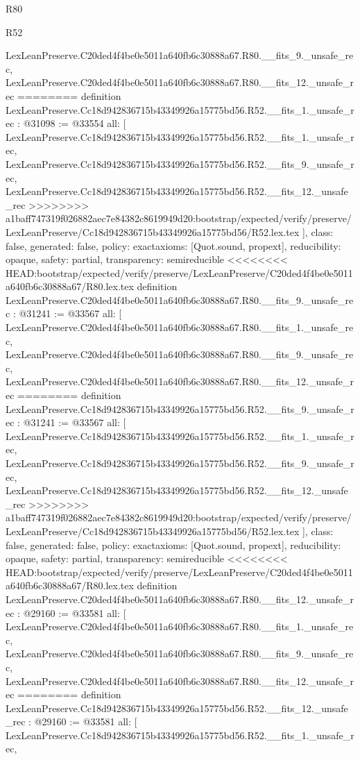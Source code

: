 \begin{lexlean}{R80}
\begin{lexlean}{R52}
\begin{coremodule}
{{{{{{{{{{{{{{{{{{{{{{{{{{{{{{{{{{{{{{{{{{{{{{{{{{{{{{{{{{{{{{{{{{{{{{{{{{{{{{{{{{{{{{{{{{{{{{{{{{{{{{{{{{{{{{{{{{{{{{{{{{{{{{{{{{{{{{{{{{{{{{{{{{{{{{{{{{{    LexLeanPreserve.C20ded4f4be0e5011a640fb6c30888a67.R80.__fits_9._unsafe_rec,
    LexLeanPreserve.C20ded4f4be0e5011a640fb6c30888a67.R80.__fits_12._unsafe_rec
========
definition LexLeanPreserve.Cc18d942836715b43349926a15775bd56.R52.__fits_1._unsafe_rec : @31098 := @33554 {
  all: [
    LexLeanPreserve.Cc18d942836715b43349926a15775bd56.R52.__fits_1._unsafe_rec,
    LexLeanPreserve.Cc18d942836715b43349926a15775bd56.R52.__fits_9._unsafe_rec,
    LexLeanPreserve.Cc18d942836715b43349926a15775bd56.R52.__fits_12._unsafe_rec
>>>>>>>> a1baff747319f026882aec7e84382c8619949d20:bootstrap/expected/verify/preserve/LexLeanPreserve/Cc18d942836715b43349926a15775bd56/R52.lex.tex
  ],
  class: false,
  generated: false,
  policy: exact{axioms: [Quot.sound, propext]},
  reducibility: opaque{},
  safety: partial,
  transparency: semireducible
}
<<<<<<<< HEAD:bootstrap/expected/verify/preserve/LexLeanPreserve/C20ded4f4be0e5011a640fb6c30888a67/R80.lex.tex
definition LexLeanPreserve.C20ded4f4be0e5011a640fb6c30888a67.R80.__fits_9._unsafe_rec : @31241 := @33567 {
  all: [
    LexLeanPreserve.C20ded4f4be0e5011a640fb6c30888a67.R80.__fits_1._unsafe_rec,
    LexLeanPreserve.C20ded4f4be0e5011a640fb6c30888a67.R80.__fits_9._unsafe_rec,
    LexLeanPreserve.C20ded4f4be0e5011a640fb6c30888a67.R80.__fits_12._unsafe_rec
========
definition LexLeanPreserve.Cc18d942836715b43349926a15775bd56.R52.__fits_9._unsafe_rec : @31241 := @33567 {
  all: [
    LexLeanPreserve.Cc18d942836715b43349926a15775bd56.R52.__fits_1._unsafe_rec,
    LexLeanPreserve.Cc18d942836715b43349926a15775bd56.R52.__fits_9._unsafe_rec,
    LexLeanPreserve.Cc18d942836715b43349926a15775bd56.R52.__fits_12._unsafe_rec
>>>>>>>> a1baff747319f026882aec7e84382c8619949d20:bootstrap/expected/verify/preserve/LexLeanPreserve/Cc18d942836715b43349926a15775bd56/R52.lex.tex
  ],
  class: false,
  generated: false,
  policy: exact{axioms: [Quot.sound, propext]},
  reducibility: opaque{},
  safety: partial,
  transparency: semireducible
}
<<<<<<<< HEAD:bootstrap/expected/verify/preserve/LexLeanPreserve/C20ded4f4be0e5011a640fb6c30888a67/R80.lex.tex
definition LexLeanPreserve.C20ded4f4be0e5011a640fb6c30888a67.R80.__fits_12._unsafe_rec : @29160 := @33581 {
  all: [
    LexLeanPreserve.C20ded4f4be0e5011a640fb6c30888a67.R80.__fits_1._unsafe_rec,
    LexLeanPreserve.C20ded4f4be0e5011a640fb6c30888a67.R80.__fits_9._unsafe_rec,
    LexLeanPreserve.C20ded4f4be0e5011a640fb6c30888a67.R80.__fits_12._unsafe_rec
========
definition LexLeanPreserve.Cc18d942836715b43349926a15775bd56.R52.__fits_12._unsafe_rec : @29160 := @33581 {
  all: [
    LexLeanPreserve.Cc18d942836715b43349926a15775bd56.R52.__fits_1._unsafe_rec,
}}}}}}}}}}}}}}}}}}}}}}}}}}}}}}}}}}}}}}}}}}}}}}}}}}}}}}}}}}}}}}}}}}}}}}}}}}}}}}}}}}}}}}}}}}}}}}}}}}}}}}}}}}}}}}}}}}}}}}}}}}}}}}}}}}}}}}}}}}}}}}}}}}}}}}}}}}}}}}
\end{coremodule}
\end{lexlean}
\end{lexlean}

